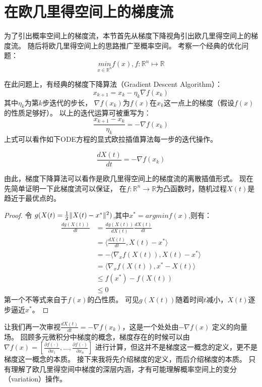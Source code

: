 

\section{在欧几里得空间上的梯度流}
为了引出概率空间上的梯度流，本节首先从梯度下降视角引出欧几里得空间上的梯度流。
随后将欧几里得空间上的思路推广至概率空间。
考察一个经典的优化问题：
$$ \underset{x \in \mathbb{R}^{n}}{min} f(x) ,f:\mathbb{R} ^n \mapsto \mathbb{R} $$
\par
在此问题上，有经典的梯度下降算法（Gradient Descent Algorithm）：
\begin{equation}
    x_{k+1} = x_{k} - \eta_{k} \nabla f(x_{k}) %
\end{equation}
其中$\eta_{k}$为第$k$步迭代的步长，
$\nabla f(x_{k})$为$f(x)$在$x_{k}$这一点上的梯度（假设$f(x)$的性质足够好）。
以上的迭代运算可被重写为：
$$ \frac{x_{k+1}-x_{k}}{\eta_{k}} =  -\nabla f(x_{k})$$
上式可以看作如下ODE方程的显式欧拉插值算法每一步的迭代操作。

\begin{equation}
    \frac{dX(t)}{dt} =  -\nabla f(x_{k}) %
\end{equation}

由此，梯度下降算法可以看作是欧几里得空间上的梯度流的离散插值形式。
现在先简单证明一下此梯度流可以保证，
在$f:\mathbb{R}^{n}\rightarrow\mathbb{R}$为凸函数时，随机过程$X(t)$是趋近于最优点的。
\begin{proof}
    令 $     g(X(t)=\frac{1}{2}\Arrowvert X(t)-x^* \Arrowvert^2)$,其中$x^*=argminf(x)$,则有：
    \begin{equation}
        \begin{aligned}
            \frac{dg(X(t))}{dt}&=\frac{dg(X(t))}{dX(t)}\frac{dX(t)}{dt}\\
           &=\langle  \frac{dX(t)}{dt},X(t)-x^*  \rangle\\
           &= - \langle  \nabla_x f(X(t)),X(t)-x^*  \rangle\\
           &=  \langle  \nabla_x f(X(t)),x^*-X(t)  \rangle\\
           &\leqslant f(x^*)-f(X(t))\\
           &\leqslant 0
        \end{aligned}
    \end{equation}
    第一个不等式来自于$f(x)$的凸性质。\newline
    可见$g(X(t))$随着时间$t$减小，$X(t)$逐步逼近$x^*$。
\end{proof}

\par
让我们再一次审视$\frac{dX(t)}{dt} =  -\nabla f(x_{k}) $，这是一个处处由$-\nabla f(x)$ 定义的向量场。
回顾多元微积分中梯度的概念，梯度存在的时候可以由
$\nabla f(x) = [ \frac{\partial  f(\cdot )}{\partial  x_1} 
,\dots,\frac{\partial  f(\cdot )}{\partial  x_n}] $
进行计算，但这并不是梯度这一概念的定义，更不是梯度这一概念的本质。
接下来我将先介绍梯度的定义，而后介绍梯度的本质。
只有理解了欧几里得空间中梯度的深层内涵，才有可能理解概率空间上的变分（variation）操作。

